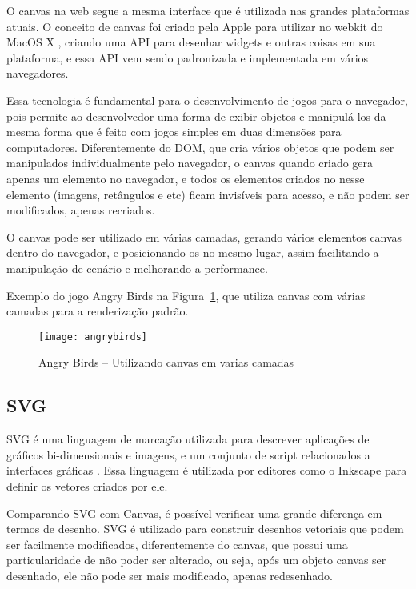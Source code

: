O canvas na web segue a mesma interface que é utilizada nas grandes
plataformas atuais. O conceito de canvas foi criado pela Apple para
utilizar no webkit do MacOS X \cite{lubbers2010pro}, criando uma API
para desenhar widgets e outras coisas em sua plataforma, e essa API
vem sendo padronizada e implementada em vários navegadores.

Essa tecnologia é fundamental para o desenvolvimento de jogos para
o navegador, pois permite ao desenvolvedor uma forma de exibir
objetos e manipulá-los da mesma forma que é feito com jogos
simples em duas dimensões para computadores.
Diferentemente do DOM, que cria vários objetos que podem ser
manipulados individualmente pelo navegador, o canvas quando criado
gera apenas um elemento no navegador, e todos os elementos criados
no nesse elemento (imagens, retângulos e etc) ficam invisíveis para acesso, e
não podem ser modificados, apenas recriados.

O canvas pode ser utilizado em várias camadas, gerando vários
elementos canvas dentro do navegador, e posicionando-os no mesmo
lugar, assim facilitando a manipulação de cenário e melhorando a
performance.

Exemplo do jogo Angry Birds na Figura~\ref{img:angrybirds}, que
utiliza canvas com várias camadas para a renderização padrão.

\newlength{\imgwidth}
\setlength{\imgwidth}{16.09cm}
\newlength{\imgheight}
\setlength{\imgheight}{10.59cm}

\begin{figure}[H]
  \centering
	\texttt{[image: angrybirds]}
  \caption{Angry Birds {--} Utilizando canvas em varias camadas}
  \label{img:angrybirds}
\end{figure}


\subsection{SVG}

SVG é uma linguagem de marcação utilizada para descrever aplicações de gráficos
bi-dimensionais e imagens, e um conjunto de script relacionados a
interfaces gráficas \cite{website:w3csvg}. Essa linguagem é utilizada por
editores como o Inkscape para definir os vetores criados por ele.

Comparando SVG com Canvas, é possível verificar uma grande diferença
em termos de desenho. SVG é utilizado para construir desenhos
vetoriais que podem ser facilmente modificados, diferentemente do
canvas, que possui uma particularidade de não poder ser alterado, ou
seja, após um objeto canvas ser desenhado, ele não pode ser mais
modificado, apenas redesenhado.

